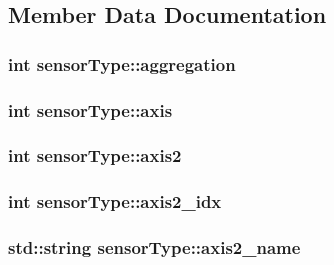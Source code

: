 \subsection{Member Data Documentation}
\hypertarget{structsensorType_aaf364b2726c24b2f1e8555f12affe945}{
\subsubsection[{aggregation}]{\setlength{\rightskip}{0pt plus 5cm}int sensor\-Type\-::aggregation}}\label{structsensorType_aaf364b2726c24b2f1e8555f12affe945}
\hypertarget{structsensorType_af6bb097492d08aba292d4fd3fe26bc72}{
\subsubsection[{axis}]{\setlength{\rightskip}{0pt plus 5cm}int sensor\-Type\-::axis}}\label{structsensorType_af6bb097492d08aba292d4fd3fe26bc72}
\hypertarget{structsensorType_ae789d72cd0530bc886972463d6ff0ad5}{
\subsubsection[{axis2}]{\setlength{\rightskip}{0pt plus 5cm}int sensor\-Type\-::axis2}}\label{structsensorType_ae789d72cd0530bc886972463d6ff0ad5}
\hypertarget{structsensorType_a4beadcfed6e0266de2a8cfa21765e491}{
\subsubsection[{axis2\-\_\-idx}]{\setlength{\rightskip}{0pt plus 5cm}int sensor\-Type\-::axis2\-\_\-idx}}\label{structsensorType_a4beadcfed6e0266de2a8cfa21765e491}
\hypertarget{structsensorType_a9c0494226b832c301af8a1a0a93b435a}{
\subsubsection[{axis2\-\_\-name}]{\setlength{\rightskip}{0pt plus 5cm}std\-::string sensor\-Type\-::axis2\-\_\-name}}\label{structsensorType_a9c0494226b832c301af8a1a0a93b435a}
